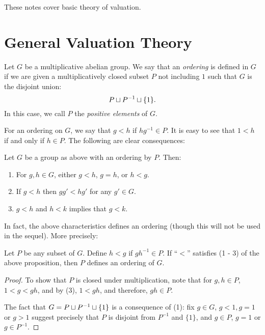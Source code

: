 These notes cover basic theory of valuation.

\section{General Valuation Theory}

\begin{defn}
Let $G$ be a multiplicative abelian group. We say that an 
\emph{ordering} is defined in $G$ if we are given a 
multiplicatively closed subset $P$ not including $1$ such that 
$G$ is the disjoint union:
\[
P \sqcup P^{-1} \sqcup \{1\}.
\]
In this case, we call $P$ the \emph{positive elements} of $G$.
\end{defn}

For an ordering on $G$, we say that $g < h$ if $hg^{-1} \in P$.
It is easy to see that $1 < h$ if and only if $h \in P$. The
following are clear consequences:

\begin{prop}
Let $G$ be a group as above with an ordering by $P$. Then:

\begin{enumerate}
\item For $g, h \in G$, either $g < h$, $g = h$, or $h < g$.

\item If $g < h$ then $gg' < hg'$ for any $g' \in G$.

\item $g < h$ and $h < k$ implies that $g < k$.
\end{enumerate}
\end{prop}

In fact, the above characteristics defines an ordering (though 
this will not be used in the sequel). More precisely:

\begin{prop}
Let $P$ be any subset of $G$. Define $h < g$ if $gh^{-1} 
\in P$. If ``$<$'' satisfies (1 - 3) of the above proposition, 
then $P$ defines an ordering of $G$.
\end{prop}
\begin{proof}
To show that $P$ is closed under multiplication, note that for
$g, h \in P$, $1 < g < gh$, and by (3), $1 < gh$, and therefore,
$gh \in P$. 

The fact that $G = P \sqcup P^{-1} \sqcup \{1\}$ is a consequence of
(1): fix $g \in G$, $g < 1, g = 1$ or $g > 1$ suggest precisely
that $P$ is disjoint from $P^{-1}$ and $\{1\}$, and $g \in P$,
$g = 1$ or $g \in P^{-1}$.
\end{proof}

